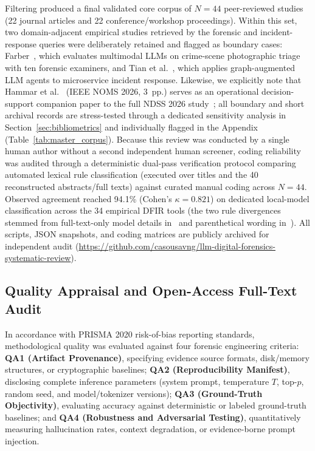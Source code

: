 Filtering produced a final validated core corpus of $N=44$ peer-reviewed studies (22 journal articles and 22 conference/workshop proceedings). Within this set, two domain-adjacent empirical studies retrieved by the forensic and incident-response queries were deliberately retained and flagged as boundary cases: Farber~\cite{farber2025_scpaiscp}, which evaluates multimodal LLMs on crime-scene photographic triage with ten forensic examiners, and Tian et al.~\cite{tian2026_gala}, which applies graph-augmented LLM agents to microservice incident response. Likewise, we explicitly note that Hammar et al.~\cite{hammar2026_a} (IEEE NOMS 2026, 3~pp.) serves as an operational decision-support companion paper to the full NDSS 2026 study~\cite{hammar2026_incident}; all boundary and short archival records are stress-tested through a dedicated sensitivity analysis in Section~\ref{sec:bibliometrics} and individually flagged in the Appendix (Table~\ref{tab:master_corpus}). Because this review was conducted by a single human author without a second independent human screener, coding reliability was audited through a deterministic dual-pass verification protocol comparing automated lexical rule classification (executed over titles and the 40 reconstructed abstracts/full texts) against curated manual coding across $N=44$. Observed agreement reached 94.1\% (Cohen's $\kappa=0.821$) on dedicated local-model classification across the 34 empirical DFIR tools (the two rule divergences stemmed from full-text-only model details in~\cite{clark2025_large} and parenthetical wording in~\cite{michelet2024_chatgpt}). All scripts, JSON snapshots, and coding matrices are publicly archived for independent audit (\url{https://github.com/casousavng/llm-digital-forensics-systematic-review}).

\subsection{Quality Appraisal and Open-Access Full-Text Audit}
In accordance with PRISMA 2020 risk-of-bias reporting standards, methodological quality was evaluated against four forensic engineering criteria: \textbf{QA1 (Artifact Provenance)}, specifying evidence source formats, disk/memory structures, or cryptographic baselines; \textbf{QA2 (Reproducibility Manifest)}, disclosing complete inference parameters (system prompt, temperature $T$, top-$p$, random seed, and model/tokenizer versions); \textbf{QA3 (Ground-Truth Objectivity)}, evaluating accuracy against deterministic or labeled ground-truth baselines; and \textbf{QA4 (Robustness and Adversarial Testing)}, quantitatively measuring hallucination rates, context degradation, or evidence-borne prompt injection.

